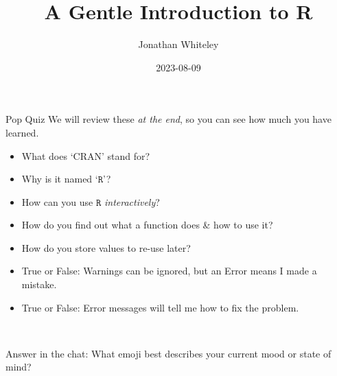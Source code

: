 \documentclass[
  ignorenonframetext,
]{beamer}
\title{A Gentle Introduction to R}
\author{Jonathan Whiteley}
\date{2023-08-09}
\providecommand{\tightlist}{%
  \setlength{\itemsep}{0pt}\setlength{\parskip}{0pt}}
\begin{document}
\frame{\titlepage}

\begin{frame}{Pop Quiz}
\protect\hypertarget{pop-quiz}{}
{\footnotesize \textcolor[rgb]{0.66,0.66,0.66}{We will review these \textit{at the end}, so you can see how much you have learned.}}

\begin{itemize}
\tightlist
\item
  What does `CRAN' stand for?
\item
  Why is it named `\(\texttt{R}\)'?
\item
  How can you use \(\texttt{R}\) \emph{interactively}?
\item
  How do you find out what a function does \& how to use it?
\item
  How do you store values to re-use later?
\item
  True or False: Warnings can be ignored, but an Error means I made a
  mistake.
\item
  True or False: Error messages will tell me how to fix the problem.
\end{itemize}

~

\begin{block}{Answer in the chat:}
\protect\hypertarget{answer-in-the-chat}{}
What emoji best describes your current mood or state of mind?
\end{block}
\end{frame}
\end{document}
